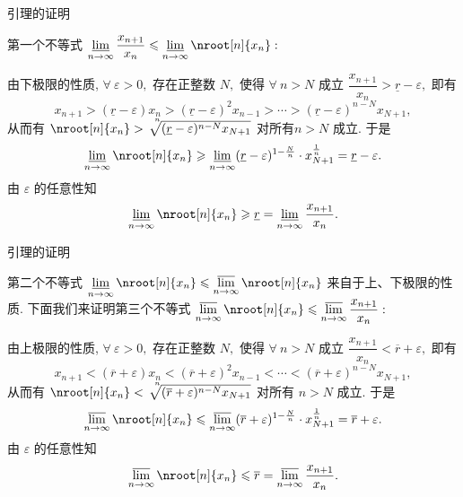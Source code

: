 
\begin{frame}{引理的证明}

第一个不等式 $\varliminf\limits_{n\to\infty} \dfrac{x_{n+1}}{x_n} \leqslant \varliminf\limits_{n\to\infty} \nroot[n]{x_n}:$

\pause
\vspace{1em}

由下极限的性质, $\forall~\varepsilon > 0,$ 存在正整数 $N,$ 使得 $\forall~n > N$ 成立 $\dfrac{x_{n+1}}{x_n} > \underline{r} - \varepsilon,$ 即有
\vspace*{-0.5em}
\[
x_{n+1} > (\underline{r} - \varepsilon) x_n > (\underline{r} - \varepsilon)^2 x_{n-1} > \cdots > (\underline{r} - \varepsilon)^{n-N} x_{N+1},
\]
从而有 $\nroot[n]{x_n} > \sqrt[\leftroot{-6}\uproot{9}n]{(\underline{r} - \varepsilon)^{n-N} x_{N+1}}$ 对所有$n > N$ 成立. 于是
\[
\varliminf\limits_{n\to\infty} \nroot[n]{x_n} \geqslant \varliminf\limits_{n\to\infty} (\underline{r} - \varepsilon)^{1-\frac{N}{n}} \cdot x_{N+1}^{\frac{1}{n}} = \underline{r} - \varepsilon.
\]
由 $\varepsilon$ 的任意性知
\[
\varliminf\limits_{n\to\infty} \nroot[n]{x_n} \geqslant \underline{r} = \varliminf\limits_{n\to\infty} \dfrac{x_{n+1}}{x_n}.
\]

\end{frame}


\begin{frame}{引理的证明}

第二个不等式 $\varliminf\limits_{n\to\infty} \nroot[n]{x_n} \leqslant \varlimsup\limits_{n\to\infty} \nroot[n]{x_n}$ 来自于上、下极限的性质. 下面我们来证明第三个不等式 $\varlimsup\limits_{n\to\infty} \nroot[n]{x_n} \leqslant \varlimsup\limits_{n\to\infty} \dfrac{x_{n+1}}{x_n}:$

\pause
\vspace{1em}

由上极限的性质, $\forall~\varepsilon > 0,$ 存在正整数 $N,$ 使得 $\forall~n > N$ 成立 $\dfrac{x_{n+1}}{x_n} < \overline{r} + \varepsilon,$ 即有
\vspace*{-0.5em}
\[
x_{n+1} < (\overline{r} + \varepsilon) x_n < (\overline{r} + \varepsilon)^2 x_{n-1} < \cdots < (\overline{r} + \varepsilon)^{n-N} x_{N+1},\]
从而有 $\nroot[n]{x_n} < \sqrt[\leftroot{-6}\uproot{9}n]{(\overline{r} + \varepsilon)^{n-N} x_{N+1}}$ 对所有 $n > N$ 成立. 于是
\[
\varlimsup\limits_{n\to\infty} \nroot[n]{x_n} \leqslant \varlimsup\limits_{n\to\infty} (\overline{r} + \varepsilon)^{1-\frac{N}{n}} \cdot x_{N+1}^{\frac{1}{n}} = \overline{r} + \varepsilon.
\]
由 $\varepsilon$ 的任意性知
\[
\varlimsup\limits_{n\to\infty} \nroot[n]{x_n} \leqslant \overline{r} = \varlimsup\limits_{n\to\infty} \dfrac{x_{n+1}}{x_n}.
\]

\end{frame}

